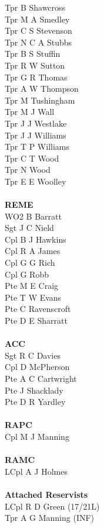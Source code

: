 \begin{multicols}{4}
  Tpr B Shawcross \\
  Tpr M A Smedley \\
  Tpr C S Stevenson \\
  Tpr N C A Stubbs \\
  Tpr B S Stuffin \\
  Tpr R W Sutton \\
  Tpr G R Thomas \\
  Tpr A W Thompson \\
  Tpr M Tushingham \\
  Tpr M J Wall \\
  Tpr J J Westlake \\
  Tpr J J Williams \\
  Tpr T P Williams \\
  Tpr C T Wood \\
  Tpr N Wood \\
  Tpr E E Woolley \\
  \\
  \textbf{REME} \\
  WO2 B Barratt \\
  Sgt J C Nield \\
  Cpl B J Hawkins \\
  Cpl R A James \\
  Cpl G G Rich \\
  Cpl G Robb \\
  Pte M E Craig \\
  Pte T W Evans \\
  Pte C Ravenscroft \\
  Pte D E Sharratt \\
  \\
  \textbf{ACC} \\
  Sgt R C Davies \\
  Cpl D McPherson \\
  Pte A C Cartwright \\
  Pte J Shacklady \\
  Pte D R Yardley \\
  \\
  \textbf{RAPC} \\
  Cpl M J Manning \\
  \\
  \textbf{RAMC} \\
  LCpl A J Holmes \\
  \\
  \textbf{Attached Reservists} \\
  LCpl R D Green (17/21L) \\
  Tpr A G Manning (INF) \\

\end{multicols}
